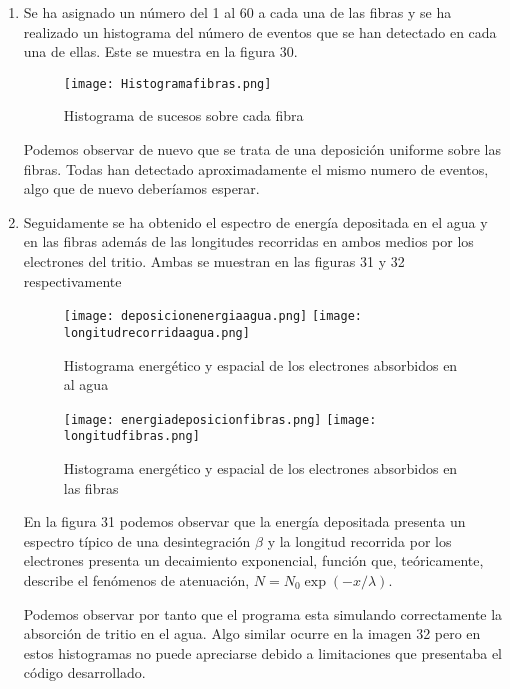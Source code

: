 \begin{enumerate}
\item{} Se ha asignado un número del 1 al 60 a cada una de las fibras y se ha realizado un histograma del número de eventos que se han detectado en cada una de ellas. Este se muestra en la figura 30.

\begin{figure}[hbtp]
\centering
\texttt{[image: Histogramafibras.png]}
\caption{Histograma de sucesos sobre cada fibra\label{sucesossobrecadafibra}}
\end{figure}

Podemos observar de nuevo que se trata de una deposición uniforme sobre las fibras. Todas han detectado aproximadamente el mismo numero de eventos, algo que de nuevo deberíamos esperar.

\item{} Seguidamente se ha obtenido el espectro de energía depositada en el agua y en las fibras además de las longitudes recorridas en ambos medios por los electrones del tritio. Ambas se muestran en las figuras 31 y 32 respectivamente

\begin{figure}[htb]
\centering
{
\texttt{[image: deposicionenergiaagua.png]} 
}
{
\texttt{[image: longitudrecorridaagua.png]} 
}
\caption{Histograma energético y espacial de los electrones absorbidos en al agua\label{deposicionagua}}
\end{figure}

\begin{figure}[htb]
\centering
{
\texttt{[image: energiadeposicionfibras.png]} 
}
{
\texttt{[image: longitudfibras.png]} 
}
\caption{Histograma energético y espacial de los electrones absorbidos en las fibras\label{deposicionfibras}}
\end{figure}

En la figura 31 podemos observar que la energía depositada presenta un espectro típico de una desintegración $\beta$ y la longitud recorrida por los electrones presenta un decaimiento exponencial, función que, teóricamente, describe el fenómenos de atenuación, $N=N_0\exp{(-x/\lambda)}$. 

Podemos observar por tanto que el programa esta simulando correctamente la absorción de tritio en el agua. Algo similar ocurre en la imagen 32 pero en estos histogramas no puede apreciarse debido a limitaciones que presentaba el código desarrollado.


\end{enumerate}
